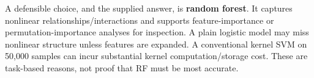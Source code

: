 A defensible choice, and the supplied answer, is \textbf{random forest}. It captures nonlinear relationships/interactions and supports feature-importance or permutation-importance analyses for inspection. A plain logistic model may miss nonlinear structure unless features are expanded. A conventional kernel SVM on 50,000 samples can incur substantial kernel computation/storage cost. These are task-based reasons, not proof that RF must be most accurate.
